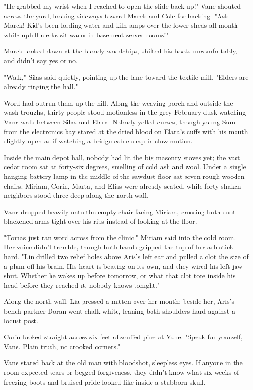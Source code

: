 "He grabbed my wrist when I reached to open the slide back up!" Vane shouted across the yard, looking sideways toward Marek and Cole for backing. "Ask Marek! Kid's been lording water and kiln amps over the lower sheds all month while uphill clerks sit warm in basement server rooms!"

Marek looked down at the bloody woodchips, shifted his boots uncomfortably, and didn't say yes or no.

"Walk," Silas said quietly, pointing up the lane toward the textile mill. "Elders are already ringing the hall."

Word had outrun them up the hill. Along the weaving porch and outside the wash troughs, thirty people stood motionless in the grey February dusk watching Vane walk between Silas and Elara. Nobody yelled curses, though young Sam from the electronics bay stared at the dried blood on Elara's cuffs with his mouth slightly open as if watching a bridge cable snap in slow motion.

Inside the main depot hall, nobody had lit the big masonry stoves yet; the vast cedar room sat at forty-six degrees, smelling of cold ash and wool. Under a single hanging battery lamp in the middle of the sawdust floor sat seven rough wooden chairs. Miriam, Corin, Marta, and Elias were already seated, while forty shaken neighbors stood three deep along the north wall.

Vane dropped heavily onto the empty chair facing Miriam, crossing both soot-blackened arms tight over his ribs instead of looking at the floor.

"Tomas just ran word across from the clinic," Miriam said into the cold room. Her voice didn't tremble, though both hands gripped the top of her ash stick hard. "Lin drilled two relief holes above Aris's left ear and pulled a clot the size of a plum off his brain. His heart is beating on its own, and they wired his left jaw shut. Whether he wakes up before tomorrow, or what that clot tore inside his head before they reached it, nobody knows tonight."

Along the north wall, Lia pressed a mitten over her mouth; beside her, Aris's bench partner Doran went chalk-white, leaning both shoulders hard against a locust post.

Corin looked straight across six feet of scuffed pine at Vane. "Speak for yourself, Vane. Plain truth, no crooked corners."

Vane stared back at the old man with bloodshot, sleepless eyes. If anyone in the room expected tears or begged forgiveness, they didn't know what six weeks of freezing boots and bruised pride looked like inside a stubborn skull.

